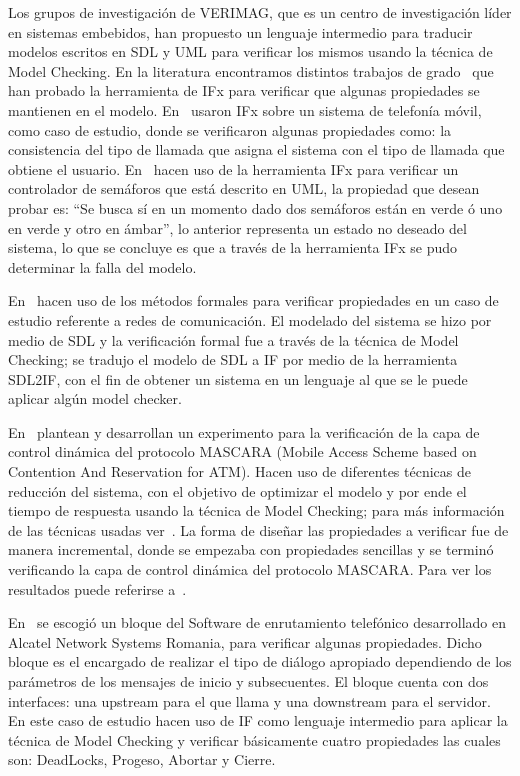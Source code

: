 Los grupos de investigaci\'on de VERIMAG, que es un centro de investigaci\'on l\'ider en sistemas embebidos, han propuesto un lenguaje intermedio para traducir modelos escritos en SDL y UML para verificar los mismos usando la t\'ecnica de Model Checking. En la literatura encontramos distintos trabajos de grado~\cite{BravoParra2006, Perez2006} que han probado la herramienta de IFx para verificar que algunas propiedades se mantienen en el modelo. En~\cite{BravoParra2006} usaron IFx sobre un sistema de telefon\'ia m\'ovil, como caso de estudio, donde se verificaron algunas propiedades como: la consistencia del tipo de llamada que asigna el sistema con el tipo de llamada que obtiene el usuario. En~\cite{Perez2006} hacen uso de la herramienta IFx para verificar un controlador de sem\'aforos que est\'a descrito en UML, la propiedad que desean probar es: “Se busca s\'i en un momento dado dos sem\'aforos est\'an en verde \'o uno en verde y otro en \'ambar”, lo anterior representa un  estado no deseado del sistema, lo que se concluye es que a trav\'es de la herramienta IFx se pudo determinar la falla del modelo.

En~\cite{Vaovic2005} hacen uso de los m\'etodos formales para verificar propiedades en un caso de estudio referente a redes de comunicaci\'on. El modelado del sistema se hizo por medio de SDL y la verificaci\'on formal fue a trav\'es de la t\'ecnica de Model Checking; se tradujo el modelo de SDL a IF por medio de la herramienta SDL2IF, con el fin de obtener un sistema en un lenguaje al que se le puede aplicar alg\'un model checker. 

En~\cite{Jia2001} plantean y desarrollan un experimento para la verificaci\'on de la capa de control din\'amica del protocolo MASCARA (Mobile Access Scheme based on Contention And Reservation for ATM). Hacen uso de diferentes t\'ecnicas de reducci\'on del sistema, con el objetivo de optimizar el modelo y por ende el tiempo de respuesta usando la t\'ecnica  de Model Checking; para m\'as informaci\'on de las t\'ecnicas usadas ver~\cite{Jia2001}. La forma de diseñar las propiedades a verificar fue de manera incremental, donde se empezaba con propiedades sencillas y se termin\'o verificando la capa de control din\'amica del protocolo MASCARA. Para ver los resultados puede referirse a~\cite{Jia2001}.

En~\cite{MariusMinea} se escogi\'o un bloque del  Software de enrutamiento telef\'onico desarrollado en Alcatel Network Systems Romania, para verificar algunas propiedades. Dicho bloque es el encargado de realizar el tipo de di\'alogo apropiado dependiendo de los par\'ametros de los mensajes de inicio y subsecuentes. El bloque cuenta con dos interfaces: una upstream para el que llama y una downstream para el servidor. En este caso de estudio hacen uso de IF como lenguaje intermedio para aplicar la t\'ecnica de Model Checking y verificar b\'asicamente cuatro propiedades las cuales son: DeadLocks, Progeso, Abortar y Cierre. 

